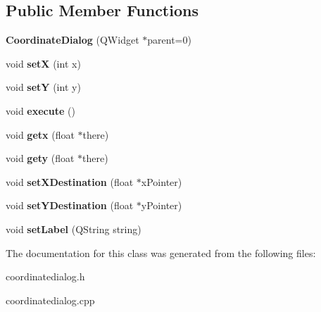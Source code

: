 \subsection*{Public Member Functions}
\begin{DoxyCompactItemize}
\item 
{\bfseries Coordinate\+Dialog} (Q\+Widget $\ast$parent=0)\hypertarget{classCoordinateDialog_adb54b852402001aaf310b64d7c598846}{}\label{classCoordinateDialog_adb54b852402001aaf310b64d7c598846}

\item 
void {\bfseries setX} (int x)\hypertarget{classCoordinateDialog_a9b05d1ccee4e0c9ddd1d60fc0d3cc080}{}\label{classCoordinateDialog_a9b05d1ccee4e0c9ddd1d60fc0d3cc080}

\item 
void {\bfseries setY} (int y)\hypertarget{classCoordinateDialog_a7dd30911922f73ddd3274364bbfadd9a}{}\label{classCoordinateDialog_a7dd30911922f73ddd3274364bbfadd9a}

\item 
void {\bfseries execute} ()\hypertarget{classCoordinateDialog_a7d5c49c60984e2fa536664e9de317255}{}\label{classCoordinateDialog_a7d5c49c60984e2fa536664e9de317255}

\item 
void {\bfseries getx} (float $\ast$there)\hypertarget{classCoordinateDialog_a49fd02c80700150c4dd608bf78784b95}{}\label{classCoordinateDialog_a49fd02c80700150c4dd608bf78784b95}

\item 
void {\bfseries gety} (float $\ast$there)\hypertarget{classCoordinateDialog_aae06ec512c9b2f7341d1d9974f2468f8}{}\label{classCoordinateDialog_aae06ec512c9b2f7341d1d9974f2468f8}

\item 
void {\bfseries set\+X\+Destination} (float $\ast$x\+Pointer)\hypertarget{classCoordinateDialog_a0ef29e7ef32050b9401db653a1f8525b}{}\label{classCoordinateDialog_a0ef29e7ef32050b9401db653a1f8525b}

\item 
void {\bfseries set\+Y\+Destination} (float $\ast$y\+Pointer)\hypertarget{classCoordinateDialog_a08fbb42162a66cca3f7fe96cfbfc1744}{}\label{classCoordinateDialog_a08fbb42162a66cca3f7fe96cfbfc1744}

\item 
void {\bfseries set\+Label} (Q\+String string)\hypertarget{classCoordinateDialog_af11af9af9ccf1c973f6d7a04226fcf93}{}\label{classCoordinateDialog_af11af9af9ccf1c973f6d7a04226fcf93}

\end{DoxyCompactItemize}


The documentation for this class was generated from the following files\+:\begin{DoxyCompactItemize}
\item 
coordinatedialog.\+h\item 
coordinatedialog.\+cpp\end{DoxyCompactItemize}
